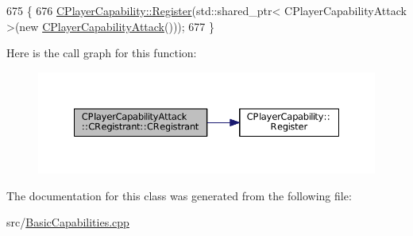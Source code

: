 \begin{DoxyCode}
675                                                \{
676     \hyperlink{classCPlayerCapability_a7e298018dcde2684451add3cfff065f7}{CPlayerCapability::Register}(std::shared\_ptr< CPlayerCapabilityAttack >(\textcolor{keyword}{new} 
      \hyperlink{classCPlayerCapabilityAttack_ae9430ec5ce80a461030603c5cab0525c}{CPlayerCapabilityAttack}()));   
677 \}
\end{DoxyCode}
Here is the call graph for this function\+:\nopagebreak
\begin{figure}[H]
\begin{center}
\leavevmode
\includegraphics[width=350pt]{classCPlayerCapabilityAttack_1_1CRegistrant_afe5887c5ba5ae7d0b65e4820d6f9143e_cgraph}
\end{center}
\end{figure}


The documentation for this class was generated from the following file\+:\begin{DoxyCompactItemize}
\item 
src/\hyperlink{BasicCapabilities_8cpp}{Basic\+Capabilities.\+cpp}\end{DoxyCompactItemize}
